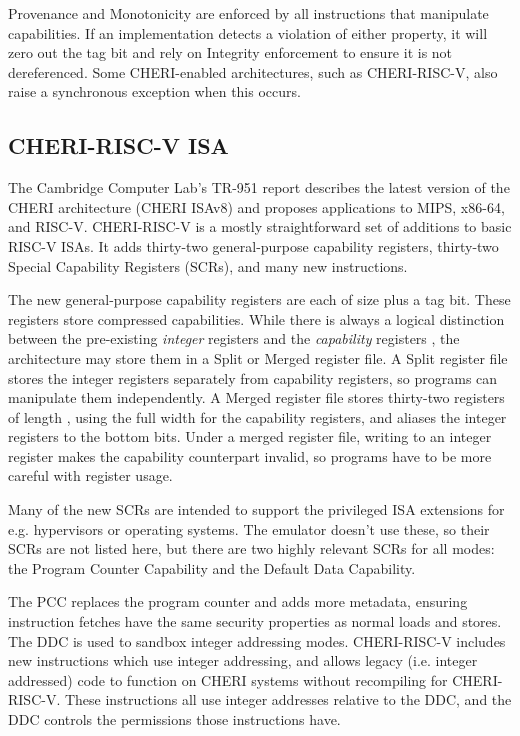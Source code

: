 Provenance and Monotonicity are enforced by all instructions that manipulate capabilities.
If an implementation detects a violation of either property, it will zero out the tag bit and rely on Integrity enforcement to ensure it is not dereferenced.
Some CHERI-enabled architectures, such as CHERI-RISC-V, also raise a synchronous exception when this occurs.

\subsection{CHERI-RISC-V ISA}
The Cambridge Computer Lab's TR-951 report\cite{TR-951} describes the latest version of the CHERI architecture (CHERI ISAv8) and proposes applications to MIPS, x86-64, and RISC-V.
CHERI-RISC-V is a mostly straightforward set of additions to basic RISC-V ISAs.
It adds thirty-two general-purpose capability registers, thirty-two Special Capability Registers (SCRs), and many new instructions.

The new general-purpose capability registers are each of size  plus a tag bit.
These registers store compressed capabilities.
While there is always a logical distinction between the pre-existing \emph{integer} registers  and the \emph{capability} registers , the architecture may store them in a Split or Merged register file.
A Split register file stores the integer registers separately from capability registers, so programs can manipulate them independently.
A Merged register file stores thirty-two registers of length , using the full width for the capability registers, and aliases the integer registers to the bottom  bits.
Under a merged register file, writing to an integer register makes the capability counterpart invalid, so programs have to be more careful with register usage.


Many of the new SCRs are intended to support the privileged ISA extensions for e.g. hypervisors or operating systems.
The emulator doesn't use these, so their SCRs are not listed here, but there are two highly relevant SCRs for all modes: the Program Counter Capability and the Default Data Capability.

The PCC replaces the program counter and adds more metadata, ensuring instruction fetches have the same security properties as normal loads and stores.
The DDC is used to sandbox integer addressing modes.
CHERI-RISC-V includes new instructions which use integer addressing, and allows legacy (i.e. integer addressed) code to function on CHERI systems without recompiling for CHERI-RISC-V.
These instructions all use integer addresses relative to the DDC, and the DDC controls the permissions those instructions have.

